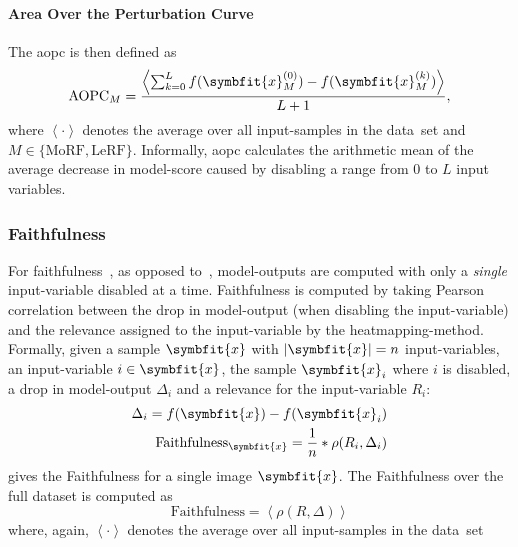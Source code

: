 \paragraph{Area Over the Perturbation Curve}
The \gls{aopc} is then defined as
\[
    \text{AOPC}_M = \dfrac{\left< \sum_{k=0}^{L} f(\symbfit{x}^{(0)}_{M}) - f(\symbfit{x}^{(k)}_{M}) \right>}{L+1},
\]
where \(\left< \cdot \right>\) denotes the average over all input-samples in the \mbox{data set} and \(M \in \{\text{MoRF}, \text{LeRF}\}\). Informally, \gls{aopc} calculates the arithmetic mean of the average decrease in model-score caused by disabling a range from \(0\) to \(L\) input variables.

\subsubsection{Faithfulness}\label{metrics:faithfulness}
For faithfulness~\cite{AlvarezMelis.2018, Tomsett.2019}, as opposed to~, model-outputs are computed with only a \textit{single} input-variable disabled at a time. Faithfulness is computed by taking Pearson correlation between the drop in model-output (when disabling the input-variable) and the relevance assigned to the input-variable by the heatmapping-method. Formally, given a sample \(\symbfit{x}\) with \(\left|\symbfit{x}\right|=n\) input-variables, an input-variable \(i\in \symbfit{x}\), the sample \(\symbfit{x}_i\) where \(i\) is disabled, a drop in model-output \(\Delta_i\) and a relevance for the input-variable \(R_i\):
\begin{align*}
    \Delta_i = f(\symbfit{x}) - f(\symbfit{x}_i)\\
    \text{Faithfulness}_{\symbfit{x}} = \frac{1}{n}*\rho(R_i, \Delta_i)
\end{align*}
gives the Faithfulness for a single image \(\symbfit{x}\). The Faithfulness over the full dataset is computed as
\[
    \text{Faithfulness} = \left<\rho(R, \Delta)\right>
\]
where, again, \(\left< \cdot \right>\) denotes the average over all input-samples in the \mbox{data set}


